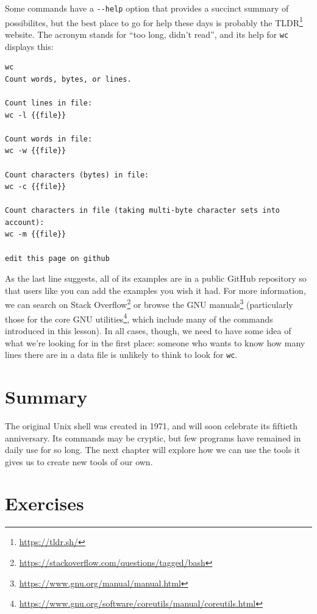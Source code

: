 \documentclass[
]{krantz}
\renewcommand{\href}[2]{#2\footnote{\url{#1}}}
\begin{document}
Some commands have a \texttt{-\/-help} option that provides a succinct summary of possibilites,
but the best place to go for help these days is probably the \href{https://tldr.sh/}{TLDR} website.
The acronym stands for ``too long, didn't read'',
and its help for \texttt{wc} displays this:

\begin{verbatim}
wc
Count words, bytes, or lines.

Count lines in file:
wc -l {{file}}

Count words in file:
wc -w {{file}}

Count characters (bytes) in file:
wc -c {{file}}

Count characters in file (taking multi-byte character sets into account):
wc -m {{file}}

edit this page on github
\end{verbatim}

As the last line suggests,
all of its examples are in a public GitHub repository
so that users like you can add the examples you wish it had.
For more information,
we can search on \href{https://stackoverflow.com/questions/tagged/bash}{Stack Overflow}
or browse the \href{https://www.gnu.org/manual/manual.html}{GNU manuals}
(particularly those for the \href{https://www.gnu.org/software/coreutils/manual/coreutils.html}{core GNU utilities},
which include many of the commands introduced in this lesson).
In all cases,
though,
we need to have some idea of what we're looking for in the first place:
someone who wants to know how many lines there are in a data file
is unlikely to think to look for \texttt{wc}.

\hypertarget{bash-basics-summary}{%
\section{Summary}\label{bash-basics-summary}}

The original Unix shell was created in 1971,
and will soon celebrate its fiftieth anniversary.
Its commands may be cryptic,
but few programs have remained in daily use for so long.
The next chapter will explore how we can use the tools it gives us
to create new tools of our own.

\hypertarget{bash-basics-exercises}{%
\section{Exercises}\label{bash-basics-exercises}}
\end{document}
